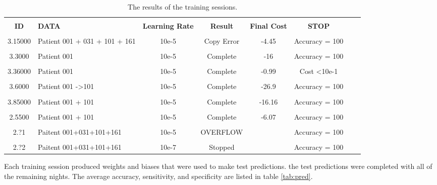 \documentclass[12pt, oneside]{book}
\begin{document}
\begin{table}[H]
	{\hspace{0cm}
		\begin{tabular}{|c|p{2cm}|c|c|c|c|c|c|}
		\hline \\ [-1.5ex]
		\textbf{ID}      & \textbf{DATA}                          & \textbf{Learning Rate} & \textbf{Result}   & \textbf{Final Cost}  & \textbf{STOP}                \\
		\hline \\ [-1.5ex]
		3.15000 & Patient 001 + 031 + 101 + 161 & 10e-5         & Copy Error & -4.45          & Accuracy = 100\\
		\hline \\ [-1.5ex]
		3.3000  & Patient 001                   & 10e-5         & Complete & -16        & Accuracy = 100\\
		\hline \\ [-1.5ex]
		3.36000 & Patient 001                   & 10e-5         & Complete & -0.99      & Cost \textless 10e-1  \\
		\hline \\ [-1.5ex]
		3.6000  & Patient 001 -\textgreater101  & 10e-5         & Complete & -26.9      & Accuracy = 100 \\
		\hline \\ [-1.5ex]
		3.85000 & Patient 001 + 101             & 10e-5         & Complete & -16.16     & Accuracy = 100 \\
		\hline \\ [-1.5ex]
		2.5500  & Patient 001 + 101             & 10e-5         & Complete & -6.07      & Accuracy = 100\\
		\hline \\ [-1.5ex]
		2.?1    & Paitent 001+031+101+161       & 10e-5         & OVERFLOW &            & Accuracy = 100 \\
		\hline \\ [-1.5ex]
		2.?2    & Paitent 001+031+101+161       & 10e-7         & Stopped  &            & Accuracy = 100 \\    
		\hline
	\end{tabular}
} 
\caption{The results of the training sessions.}
\label{tab:train}
\end{table}

Each training session produced weights and biases that were used to make test predictions. the test predictions were completed with all of the remaining nights. The average accuracy, sensitivity, and specificity are listed in table \ref{tab:pred}.
\end{document}
